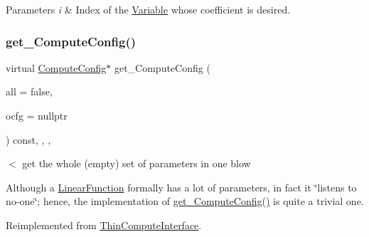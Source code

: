 \begin{DoxyParams}{Parameters}
{\em i} & Index of the \mbox{\hyperlink{class_s_m_spp__di__unipi__it_1_1_variable}{Variable}} whose coefficient is desired. \\
\hline
\end{DoxyParams}
\mbox{\label{class_s_m_spp__di__unipi__it_1_1_linear_function_a8c965c848816d9acca40c995164e5773}} 
\subsubsection{\texorpdfstring{get\+\_\+\+Compute\+Config()}{get\_ComputeConfig()}}
{\footnotesize\ttfamily virtual \mbox{\hyperlink{class_s_m_spp__di__unipi__it_1_1_compute_config}{Compute\+Config}}$\ast$ get\+\_\+\+Compute\+Config (\begin{DoxyParamCaption}\item[{bool}]{all = {\ttfamily false},  }\item[{\mbox{\hyperlink{class_s_m_spp__di__unipi__it_1_1_compute_config}{Compute\+Config}} $\ast$}]{ocfg = {\ttfamily nullptr} }\end{DoxyParamCaption}) const\hspace{0.3cm}{\ttfamily [inline]}, {\ttfamily [final]}, {\ttfamily [override]}, {\ttfamily [virtual]}}



$<$ get the whole (empty) set of parameters in one blow 

Although a \mbox{\hyperlink{class_s_m_spp__di__unipi__it_1_1_linear_function}{Linear\+Function}} formally has a lot of parameters, in fact it \char`\"{}listens to no-\/one\char`\"{}; hence, the implementation of \mbox{\hyperlink{class_s_m_spp__di__unipi__it_1_1_linear_function_a8c965c848816d9acca40c995164e5773}{get\+\_\+\+Compute\+Config()}} is quite a trivial one. 

Reimplemented from \mbox{\hyperlink{class_s_m_spp__di__unipi__it_1_1_thin_compute_interface_adaa8da125823294995410c022a59a4b5}{Thin\+Compute\+Interface}}.

\mbox{\label{class_s_m_spp__di__unipi__it_1_1_linear_function_a7ebd74c022ea1a7747ba8efe72d3e512}} 
